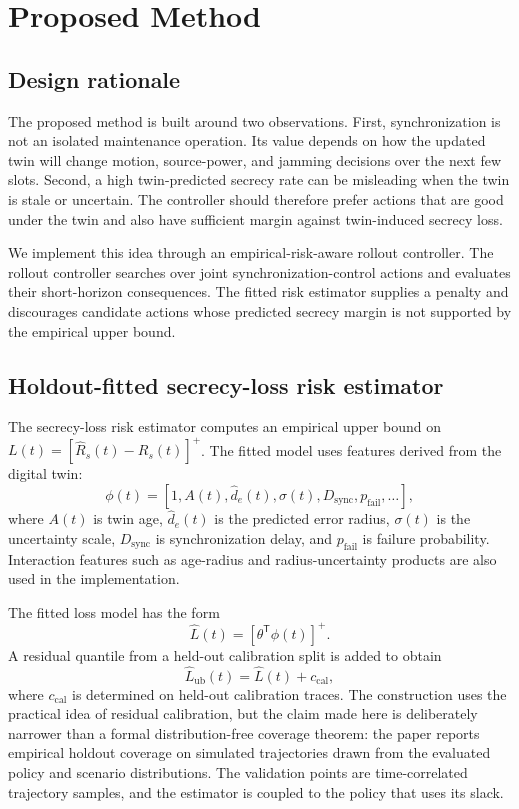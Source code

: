 \section{Proposed Method}
\label{sec:method}

\subsection{Design rationale}

The proposed method is built around two observations. First, synchronization is not an isolated maintenance operation. Its value depends on how the updated twin will change motion, source-power, and jamming decisions over the next few slots. Second, a high twin-predicted secrecy rate can be misleading when the twin is stale or uncertain. The controller should therefore prefer actions that are good under the twin and also have sufficient margin against twin-induced secrecy loss.

We implement this idea through an empirical-risk-aware rollout controller. The rollout controller searches over joint synchronization-control actions and evaluates their short-horizon consequences. The fitted risk estimator supplies a penalty and discourages candidate actions whose predicted secrecy margin is not supported by the empirical upper bound.

\subsection{Holdout-fitted secrecy-loss risk estimator}

The secrecy-loss risk estimator computes an empirical upper bound on $L(t)=[\widehat{R}_s(t)-R_s(t)]^+$. The fitted model uses features derived from the digital twin:
\begin{equation}
    \phi(t)=
    [1,A(t),\hat{d}_e(t),\sigma(t),D_{\mathrm{sync}},p_{\mathrm{fail}},\ldots],
\end{equation}
where $A(t)$ is twin age, $\hat{d}_e(t)$ is the predicted error radius, $\sigma(t)$ is the uncertainty scale, $D_{\mathrm{sync}}$ is synchronization delay, and $p_{\mathrm{fail}}$ is failure probability. Interaction features such as age-radius and radius-uncertainty products are also used in the implementation.

The fitted loss model has the form
\begin{equation}
    \widehat{L}(t)=\left[\theta^\mathsf{T}\phi(t)\right]^+.
\end{equation}
A residual quantile from a held-out calibration split is added to obtain
\begin{equation}
    \widehat{L}_{\mathrm{ub}}(t)=\widehat{L}(t)+c_{\mathrm{cal}},
\end{equation}
where $c_{\mathrm{cal}}$ is determined on held-out calibration traces. The construction uses the practical idea of residual calibration, but the claim made here is deliberately narrower than a formal distribution-free coverage theorem: the paper reports empirical holdout coverage on simulated trajectories drawn from the evaluated policy and scenario distributions. The validation points are time-correlated trajectory samples, and the estimator is coupled to the policy that uses its slack.

